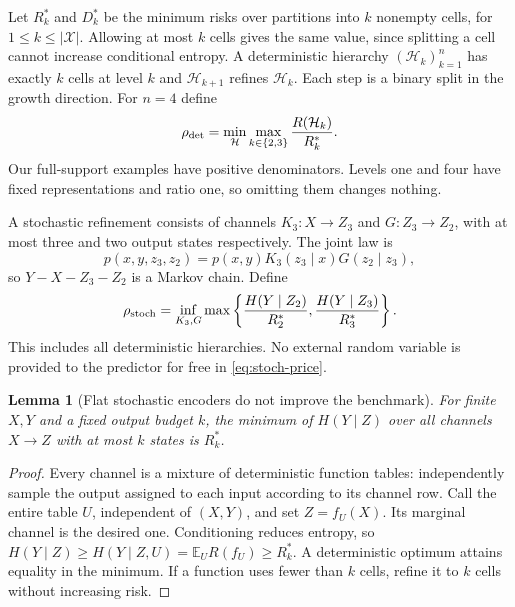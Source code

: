 \documentclass[11pt]{article}
\newtheorem{lemma}[theorem]{Lemma}
\theoremstyle{remark}\newtheorem{remark}[theorem]{Remark}
\newcommand{\E}{\mathbb E}
\newcommand{\cH}{\mathcal H}
\begin{document}
Let $R_k^*$ and $D_k^*$ be the minimum risks over partitions into $k$
nonempty cells, for $1\le k\le |\mathcal X|$. Allowing at most $k$
cells gives the same value, since splitting a cell cannot increase
conditional entropy. A deterministic hierarchy $(\cH_k)_{k=1}^n$
has exactly $k$ cells at level $k$ and $\cH_{k+1}$ refines $\cH_k$.
Each step is a binary split in the growth direction. For $n=4$ define
\begin{equation}
 \rho_{\rm det}
 =\min_{\cH}\max_{k\in\{2,3\}}\frac{R(\cH_k)}{R_k^*}.
 \label{eq:det-price}
\end{equation}
Our full-support examples have positive denominators. Levels one and four
have fixed representations and ratio one, so omitting them changes nothing.

A stochastic refinement consists of channels $K_3:X\to Z_3$ and
$G:Z_3\to Z_2$, with at most three and two output states respectively.
The joint law is
\begin{equation}
 p(x,y,z_3,z_2)=p(x,y)K_3(z_3\mid x)G(z_2\mid z_3),
 \label{eq:markov}
\end{equation}
so $Y-X-Z_3-Z_2$ is a Markov chain. Define
\begin{equation}
 \rho_{\rm stoch}
 =\inf_{K_3,G}\max\left\{
 \frac{H(Y\mid Z_2)}{R_2^*},
 \frac{H(Y\mid Z_3)}{R_3^*}\right\}.
 \label{eq:stoch-price}
\end{equation}
This includes all deterministic hierarchies. No external random variable is
provided to the predictor for free in \eqref{eq:stoch-price}.

\begin{lemma}[Flat stochastic encoders do not improve the benchmark]
\label{lem:flat}
For finite $X,Y$ and a fixed output budget $k$, the minimum of
$H(Y\mid Z)$ over all channels $X\to Z$ with at most $k$ states is
$R_k^*$.
\end{lemma}
\begin{proof}
Every channel is a mixture of deterministic function tables: independently
sample the output assigned to each input according to its channel row.
Call the entire table $U$, independent of $(X,Y)$, and set $Z=f_U(X)$.
Its marginal channel is the desired one. Conditioning reduces entropy, so
$H(Y\mid Z)\ge H(Y\mid Z,U)=\E_U R(f_U)\ge R_k^*$.
A deterministic optimum attains equality in the minimum. If a function uses
fewer than $k$ cells, refine it to $k$ cells without increasing risk.
\end{proof}
\end{document}
